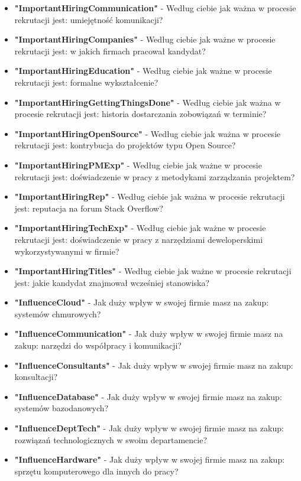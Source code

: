 \begin{appendices}
\begin{itemize}
        \item \textbf{"ImportantHiringCommunication"} - Według ciebie jak ważna w procesie rekrutacji jest: umiejętność komunikacji?
        \item \textbf{"ImportantHiringCompanies"} - Według ciebie jak ważne w procesie rekrutacji jest: w jakich firmach pracował kandydat?
        \item \textbf{"ImportantHiringEducation"} - Według ciebie jak ważne w procesie rekrutacji jest: formalne wykształcenie?
        \item \textbf{"ImportantHiringGettingThingsDone"} - Według ciebie jak ważna w procesie rekrutacji jest: historia dostarczania zobowiązań w terminie?
        \item \textbf{"ImportantHiringOpenSource"} - Według ciebie jak ważna w procesie rekrutacji jest: kontrybucja do projektów typu Open Source?
        \item \textbf{"ImportantHiringPMExp"} - Według ciebie jak ważne w procesie rekrutacji jest: doświadczenie w pracy z metodykami zarządzania projektem?
        \item \textbf{"ImportantHiringRep"} - Według ciebie jak ważna w procesie rekrutacji jest: reputacja na forum Stack Overflow?
        \item \textbf{"ImportantHiringTechExp"} - Według ciebie jak ważne w procesie rekrutacji jest: doświadczenie w pracy z narzędziami deweloperskimi wykorzystywanymi w firmie?
        \item \textbf{"ImportantHiringTitles"} - Według ciebie jak ważne w procesie rekrutacji jest: jakie kandydat znajmował wcześniej stanowiska?
        \item \textbf{"InfluenceCloud"} - Jak duży wpływ w swojej firmie masz na zakup: systemów chmurowych?
        \item \textbf{"InfluenceCommunication"} - Jak duży wpływ w swojej firmie masz na zakup: narzędzi do współpracy i komunikacji?
        \item \textbf{"InfluenceConsultants"} - Jak duży wpływ w swojej firmie masz na zakup: konsultacji?
        \item \textbf{"InfluenceDatabase"} - Jak duży wpływ w swojej firmie masz na zakup: systemów bazodanowych?
        \item \textbf{"InfluenceDeptTech"} - Jak duży wpływ w swojej firmie masz na zakup: rozwiązań technologicznych w swoim departamencie?
        \item \textbf{"InfluenceHardware"} - Jak duży wpływ w swojej firmie masz na zakup: sprzętu komputerowego dla innych do pracy?

\end{itemize}
\end{appendices}
